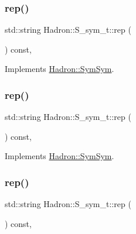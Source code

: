 \subsubsection{\texorpdfstring{rep()}{rep()}\hspace{0.1cm}{\footnotesize\ttfamily [3/5]}}
{\footnotesize\ttfamily std\+::string Hadron\+::\+S\+\_\+sym\+\_\+t\+::rep (\begin{DoxyParamCaption}{ }\end{DoxyParamCaption}) const\hspace{0.3cm}{\ttfamily [inline]}, {\ttfamily [virtual]}}



Implements \mbox{\hyperlink{structHadron_1_1SymSym_aa6e588740862036933a9efe085a5e5e5}{Hadron\+::\+Sym\+Sym}}.

\mbox{\label{structHadron_1_1S__sym__t_a1a8ccb60f6d70c9a00b8683ad8eac195}} 
\subsubsection{\texorpdfstring{rep()}{rep()}\hspace{0.1cm}{\footnotesize\ttfamily [4/5]}}
{\footnotesize\ttfamily std\+::string Hadron\+::\+S\+\_\+sym\+\_\+t\+::rep (\begin{DoxyParamCaption}{ }\end{DoxyParamCaption}) const\hspace{0.3cm}{\ttfamily [inline]}, {\ttfamily [virtual]}}



Implements \mbox{\hyperlink{structHadron_1_1SymSym_aa6e588740862036933a9efe085a5e5e5}{Hadron\+::\+Sym\+Sym}}.

\mbox{\label{structHadron_1_1S__sym__t_a1a8ccb60f6d70c9a00b8683ad8eac195}} 
\subsubsection{\texorpdfstring{rep()}{rep()}\hspace{0.1cm}{\footnotesize\ttfamily [5/5]}}
{\footnotesize\ttfamily std\+::string Hadron\+::\+S\+\_\+sym\+\_\+t\+::rep (\begin{DoxyParamCaption}{ }\end{DoxyParamCaption}) const\hspace{0.3cm}{\ttfamily [inline]}, {\ttfamily [virtual]}}



